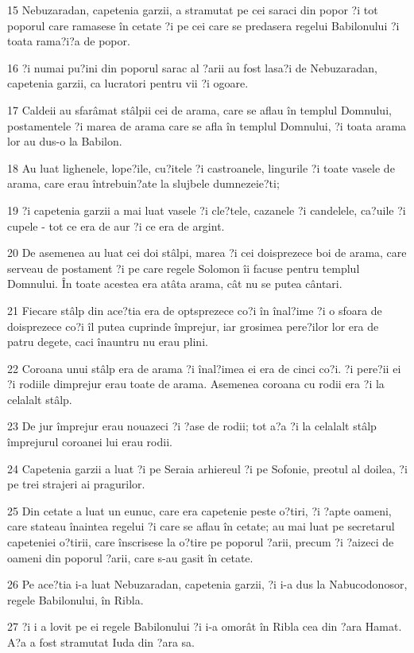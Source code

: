 \par 15 Nebuzaradan, capetenia garzii, a stramutat pe cei saraci din popor ?i tot poporul care ramasese în cetate ?i pe cei care se predasera regelui Babilonului ?i toata rama?i?a de popor.
\par 16 ?i numai pu?ini din poporul sarac al ?arii au fost lasa?i de Nebuzaradan, capetenia garzii, ca lucratori pentru vii ?i ogoare.
\par 17 Caldeii au sfarâmat stâlpii cei de arama, care se aflau în templul Domnului, postamentele ?i marea de arama care se afla în templul Domnului, ?i toata arama lor au dus-o la Babilon.
\par 18 Au luat lighenele, lope?ile, cu?itele ?i castroanele, lingurile ?i toate vasele de arama, care erau întrebuin?ate la slujbele dumnezeie?ti;
\par 19 ?i capetenia garzii a mai luat vasele ?i cle?tele, cazanele ?i candelele, ca?uile ?i cupele - tot ce era de aur ?i ce era de argint.
\par 20 De asemenea au luat cei doi stâlpi, marea ?i cei doisprezece boi de arama, care serveau de postament ?i pe care regele Solomon îi facuse pentru templul Domnului. În toate acestea era atâta arama, cât nu se putea cântari.
\par 21 Fiecare stâlp din ace?tia era de optsprezece co?i în înal?ime ?i o sfoara de doisprezece co?i îl putea cuprinde împrejur, iar grosimea pere?ilor lor era de patru degete, caci înauntru nu erau plini.
\par 22 Coroana unui stâlp era de arama ?i înal?imea ei era de cinci co?i. ?i pere?ii ei ?i rodiile dimprejur erau toate de arama. Asemenea coroana cu rodii era ?i la celalalt stâlp.
\par 23 De jur împrejur erau nouazeci ?i ?ase de rodii; tot a?a ?i la celalalt stâlp împrejurul coroanei lui erau rodii.
\par 24 Capetenia garzii a luat ?i pe Seraia arhiereul ?i pe Sofonie, preotul al doilea, ?i pe trei strajeri ai pragurilor.
\par 25 Din cetate a luat un eunuc, care era capetenie peste o?tiri, ?i ?apte oameni, care stateau înaintea regelui ?i care se aflau în cetate; au mai luat pe secretarul capeteniei o?tirii, care înscrisese la o?tire pe poporul ?arii, precum ?i ?aizeci de oameni din poporul ?arii, care s-au gasit în cetate.
\par 26 Pe ace?tia i-a luat Nebuzaradan, capetenia garzii, ?i i-a dus la Nabucodonosor, regele Babilonului, în Ribla.
\par 27 ?i i a lovit pe ei regele Babilonului ?i i-a omorât în Ribla cea din ?ara Hamat. A?a a fost stramutat Iuda din ?ara sa.
